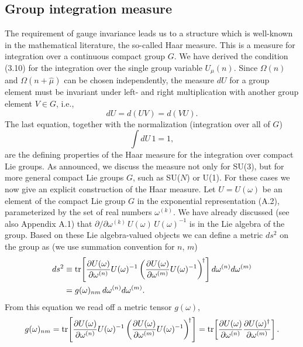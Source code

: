\subsection{Group integration measure}

The requirement of gauge invariance leads us to a structure which is well-known
in the mathematical literature, the so-called Haar measure. This is a measure
for integration over a continuous compact group $G$. We have derived the
condition (3.10) for the integration over the single group variable
$U_\mu(n)$. Since $\Omega(n)$ and $\Omega(n+\hat\mu)$ can be chosen
independently, the measure $dU$ for a group element must be invariant under
left- and right multiplication with another group element $V \in G$, i.e.,
\begin{equation}
  dU = d(UV) = d(VU).
\end{equation}
The last equation, together with the normalization (integration over all of
$G$)
\begin{equation}
  \int dU\,1 = 1,
\end{equation}
are the defining properties of the Haar measure for the integration over
compact Lie groups. As announced, we discuss the measure not only for SU(3),
but for more general compact Lie groups $G$, such as SU($N$) or U(1). For these
cases we now give an explicit construction of the Haar measure. Let
$U = U(\omega)$ be an element of the compact Lie group $G$ in the exponential
representation (A.2), parameterized by the set of real numbers
$\omega^{(k)}$. We have already discussed (see also Appendix A.1) that
$\partial/\partial\omega^{(k)}\, U(\omega)\, U(\omega)^{-1}$ is in the Lie
algebra of the group. Based on these Lie algebra-valued objects we can define a
metric $ds^2$ on the group as (we use summation convention for $n$, $m$)
\begin{equation}
  \begin{split}
    ds^2 &\equiv \operatorname{tr}\!\left[
      \frac{\partial U(\omega)}{\partial \omega^{(n)}} U(\omega)^{-1}
      \left(\frac{\partial U(\omega)}{\partial \omega^{(m)}} U(\omega)^{-1}\right)^{\!\dagger}
    \right] d\omega^{(n)} d\omega^{(m)}\\
    &= g(\omega)_{nm}\, d\omega^{(n)} d\omega^{(m)} .
  \end{split}
\end{equation}
From this equation we read off a metric tensor $g(\omega)$,
\begin{equation}
  g(\omega)_{nm} = \operatorname{tr}\!\left[
    \frac{\partial U(\omega)}{\partial \omega^{(n)}} U(\omega)^{-1}
    \left(\frac{\partial U(\omega)}{\partial \omega^{(m)}} U(\omega)^{-1}\right)^{\!\dagger}
  \right]
  = \operatorname{tr}\!\left[
    \frac{\partial U(\omega)}{\partial \omega^{(n)}}
    \frac{\partial U(\omega)^{\dagger}}{\partial \omega^{(m)}}
  \right].
\end{equation}
